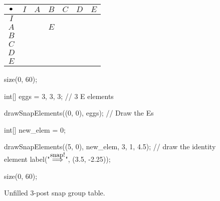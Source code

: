 \documentclass[../textbook.tex]{subfiles}
\begin{document}
\begin{figure}[h]
	\begin{center}
		\centering
		\begin{minipage}[b]{\textwidth}
			\centering
			\begin{tabular}{c|cccccc}
				\hline
				$\bullet$ & $I$ & $A$ & $B$ & $C$ & $D$ & $E$ \\ \hline
				\rowcolor{light-gray}
				$I$    &   &   &   &   &   &   \\
				$A$    &   &   & $E$ &   &   &   \\
				\rowcolor{light-gray}
				$B$    &   &   &   &   &   &   \\
				$C$    &   &   &   &   &   &   \\
				\rowcolor{light-gray}
				$D$    &   &   &   &   &   &   \\
				$E$    &   &   &   &   &   &   \\ \hline
			\end{tabular}
			\vspace*{0.5\baselineskip}
		\end{minipage}
	\end{center}
	\vspace*{-2\baselineskip}
	\begin{center}
		\begin{minipage}[t]{\textwidth}
			\caption{Unfilled $3$-post snap group table.}
			\label{fig:unfilled_table}
		\end{minipage}
	\end{center}

	\begin{center}
		\begin{minipage}[b]{.45\textwidth}
			\centering
			\begin{asy}[width=0.4\textwidth]
			size(0, 60);

			int[] eggs = {3, 3, 3}; // 3 E elements

			drawSnapElements((0, 0), eggs); // Draw the Es

			int[] new_elem = {0};

			drawSnapElements((5, 0), new_elem, 3, 1, 4.5); // draw the identity element
			label("$\stackrel{\mbox{\small snap!}}{\Longrightarrow}$", (3.5, -2.25));
			\end{asy}
		\end{minipage}
		\begin{minipage}[b]{.45\textwidth}
			\centering
			\begin{asy}[width=0.7\textwidth]
			size(0, 60);


\end{asy}
\end{minipage}
\end{center}
\end{figure}
\end{document}
